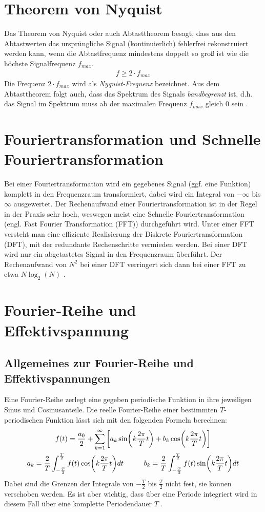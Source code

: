 \section{Theorem von Nyquist}
Das Theorem von Nyquist oder auch Abtasttheorem besagt, dass aus den Abtastwerten das ursprüngliche Signal (kontinuierlich) fehlerfrei rekonstruiert werden kann, wenn die Abtastfrequenz mindestens doppelt so groß ist wie die höchste Signalfrequenz $f_{max}$. 
\begin{gather}
    f \geq 2\cdot f_{max}
\end{gather} 
Die Frequenz $2\cdot f_{max}$ wird als \textit{Nyquist-Frequenz} bezeichnet. Aus dem Abtasttheorem folgt auch, dass das Spektrum des Signals \textit{bandbegrenzt} ist, d.h. das Signal im Spektrum muss ab der maximalen Frequenz $f_{max}$ gleich 0 sein \citep{praktikum}.
\section{Fouriertransformation und Schnelle Fouriertransformation}
Bei einer Fouriertransformation wird ein gegebenes Signal (ggf. eine Funktion) komplett in den Frequenzraum transformiert, dabei wird ein Integral von $-\infty$ bis $\infty$ ausgewertet. Der Rechenaufwand einer Fouriertransformation ist in der Regel in der Praxis sehr hoch, weswegen meist eine Schnelle Fouriertransformation (engl. Fast Fourier Transformation (FFT)) durchgeführt wird. Unter einer FFT versteht man eine effiziente Realisierung der Diskrete Fouriertransformation (DFT), mit der redundante Rechenschritte vermieden werden. Bei einer DFT wird nur ein abgetastetes Signal in den Frequenzraum überführt. Der Rechenaufwand von $N^2$ bei einer DFT verringert sich dann  bei einer FFT zu etwa $N\log_2\left(N\right)$ \citep{praktikum}.
\section{Fourier-Reihe und Effektivspannung}
\label{sec:fourierseries}
\subsection*{Allgemeines zur Fourier-Reihe und Effektivspannungen}
\label{sub:fourierseriesAllgemein}
Eine Fourier-Reihe zerlegt eine gegeben periodische Funktion in ihre jeweiligen Sinus und Cosinusanteile. Die reelle Fourier-Reihe einer bestimmten $T$-periodischen Funktion lässt sich mit den folgenden Formeln berechnen:
\begin{gather}
    f(t) = \frac{a_0}{2} + \sum^{\infty}_{k=1} \left[a_k \sin(k\frac{2\pi}{T} t) +b_k \cos(k\frac{2\pi}{T} t)\right]\\
    a_k = \frac{2}{T} \int^{\frac{T}{2}}_{-\frac{T}{2}} f(t)\cos(k \frac{2\pi}{T} t)dt \hspace*{1cm}
    b_k = \frac{2}{T} \int^{\frac{T}{2}}_{-\frac{T}{2}} f(t)\sin(k \frac{2\pi}{T} t)dt
\end{gather}
Dabei sind die Grenzen der Integrale von $-\frac{T}{2}$ bis $\frac{T}{2}$ nicht fest, sie können verschoben werden. Es ist aber wichtig, dass über eine Periode integriert wird in diesem Fall über eine komplette Periodendauer $T$ \citep{praktikum}.\\

